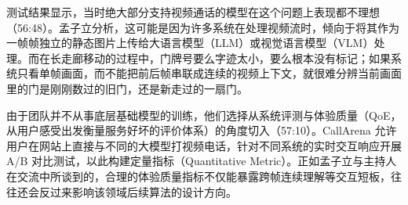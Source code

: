 \documentclass[UTF8,a4paper,11pt,fontset=fandol]{ctexart}
\begin{document}
测试结果显示，当时绝大部分支持视频通话的模型在这个问题上表现都不理想（56:48）。孟子立分析，这可能是因为许多系统在处理视频流时，倾向于将其作为一帧帧独立的静态图片上传给大语言模型（LLM）或视觉语言模型（VLM）处理。而在长走廊移动的过程中，门牌号要么字迹太小，要么根本没有标记；如果系统只看单帧画面，而不能把前后帧串联成连续的视频上下文，就很难分辨当前画面里的门是刚刚数过的旧门，还是新走过的一扇门。

由于团队并不从事底层基础模型的训练，他们选择从系统评测与体验质量（QoE，从用户感受出发衡量服务好坏的评价体系）的角度切入（57:10）。CallArena 允许用户在网站上直接与不同的大模型打视频电话，针对不同系统的实时交互响应开展 A/B 对比测试，以此构建定量指标（Quantitative Metric）。正如孟子立与主持人在交流中所谈到的，合理的体验质量指标不仅能暴露跨帧连续理解等交互短板，往往还会反过来影响该领域后续算法的设计方向。
\end{document}
